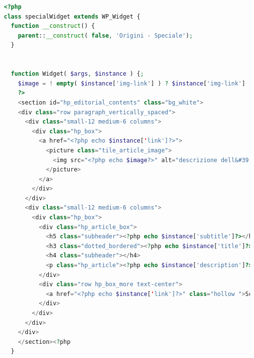 \begin{lstlisting}[style=customphp, basicstyle=\tiny, language=Php,caption={Codice del Widget \emph{Origini - Speciale}}] 
<?php
class specialWidget extends WP_Widget {
  function __construct() {
    parent::__construct( false, 'Origini - Speciale');
  }


  function Widget( $args, $instance ) {;
    $image = ! empty( $instance['img-link'] ) ? $instance['img-link'] : '';
    ?>
    <section id="hp_editorial_contents" class="bg_white">
    <div class="row paragraph_vertically_spaced">
      <div class="small-12 medium-6 columns">
        <div class="hp_box">
          <a href="<?php echo $instance['link']?>">
            <picture class="tile_article_image">
              <img src="<?php echo $image?>" alt="descrizione dell&#39;immagine">
            </picture>
          </a>
        </div>
      </div>
      <div class="small-12 medium-6 columns">
        <div class="hp_box">
          <div class="hp_article_box">
            <h5 class="subheader"><?php echo $instance['subtitle']?></h5>
            <h3 class="dotted_bordered"><?php echo $instance['title']?></h3>
            <h4 class="subheader"></h4>
            <p class="hp_article"><?php echo $instance['description']?></p>
          </div>
          <div class="row hp_box_more text-center">
            <a href="<?php echo $instance['link']?>" class="hollow ">Scopri</a>
          </div>
        </div>
      </div>
    </div>
    </section><?php
  }



\end{lstlisting}
